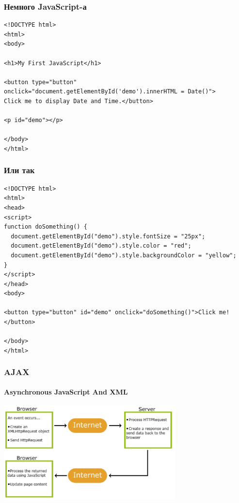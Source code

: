 \documentclass{../../slides-style}
\begin{document}
    \begin{frame}[fragile]
        \frametitle{Немного JavaScript-а}
        \begin{verbatim}
<!DOCTYPE html>
<html>
<body>

<h1>My First JavaScript</h1>

<button type="button"
onclick="document.getElementById('demo').innerHTML = Date()">
Click me to display Date and Time.</button>

<p id="demo"></p>

</body>
</html> 
        \end{verbatim}
    \end{frame}

    \begin{frame}[fragile]
        \frametitle{Или так}
        \begin{small}
            \begin{verbatim}
<!DOCTYPE html>
<html>
<head>
<script>
function doSomething() {
  document.getElementById("demo").style.fontSize = "25px";
  document.getElementById("demo").style.color = "red";
  document.getElementById("demo").style.backgroundColor = "yellow";
}
</script>
</head>
<body>

<button type="button" id="demo" onclick="doSomething()">Click me!</button>

</body>
</html>
            \end{verbatim}
        \end{small}
        \vspace{-3mm}
    \end{frame}

    \begin{frame}
        \frametitle{AJAX}
        \framesubtitle{Asynchronous JavaScript And XML}
        \begin{center}
            \includegraphics[width=0.7\textwidth]{ajax.png}
        \end{center}
    \end{frame}
\end{document}
